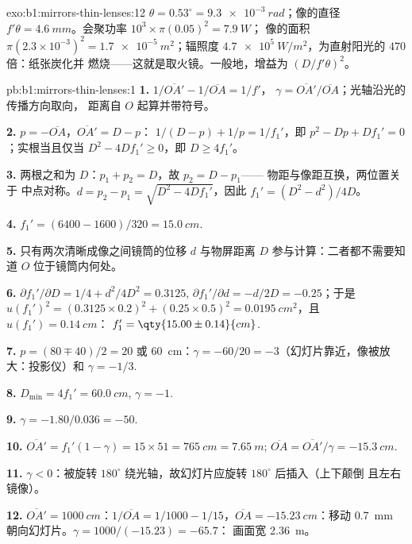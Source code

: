 \begin{solution}{exo:b1:mirrors-thin-lenses:12}
$\theta = 0.53^\circ = \qty{9.3e-3}{rad}$；像的直径 $f'\theta =
\qty{4.6}{mm}$。会聚功率 $10^3 \times \pi(0.05)^2 = \qty{7.9}{W}$；
像的面积 $\pi(2.3\times10^{-3})^2 = \qty{1.7e-5}{m^2}$；辐照度
$\qty{4.7e5}{W/m^2}$，为直射阳光的 $470$ 倍：纸张炭化并
燃烧——这就是取火镜。一般地，增益为
$(D/f'\theta)^2$。
\end{solution}

\begin{solution}{pb:b1:mirrors-thin-lenses:1}
\textbf{1.} $1/\overline{OA'} - 1/\overline{OA} = 1/f'$，
$\gamma = \overline{OA'}/\overline{OA}$；光轴沿光的传播方向取向，
距离自 $O$ 起算并带符号。

\textbf{2.} $p = -\overline{OA}$，$\overline{OA'} = D - p$：
$1/(D - p) + 1/p = 1/f_1'$，即 $p^2 - Dp + Df_1' = 0$；实根当且仅当
$D^2 - 4Df_1' \geq 0$，即 $D \geq 4f_1'$。

\textbf{3.} 两根之和为 $D$：$p_1 + p_2 = D$，故 $p_2 = D - p_1$——
物距与像距互换，两位置关于
中点对称。$d = p_2 - p_1 = \sqrt{D^2 - 4Df_1'}$，因此 $f_1' = (D^2 -
d^2)/4D$。

\textbf{4.} $f_1' = (6400 - 1600)/320 = \qty{15.0}{cm}$.

\textbf{5.} 只有两次清晰成像之间镜筒的位移 $d$
与物屏距离 $D$ 参与计算：二者都不需要知道
$O$ 位于镜筒内何处。

\textbf{6.} $\partial f_1'/\partial D = 1/4 + d^2/4D^2 = 0.3125$,
$\partial f_1'/\partial d = -d/2D = -0.25$；于是
$u(f_1')^2 = (0.3125 \times 0.2)^2 + (0.25 \times 0.5)^2 =
\qty{0.0195}{cm^2}$，且 $u(f_1') = \qty{0.14}{cm}$：
$f_1' = \qty{15.00\pm0.14}{cm}$.

\textbf{7.} $p = (80 \mp 40)/2 = 20$ 或 \qty{60}{cm}：$\gamma =
-60/20 = -3$（幻灯片靠近，像被放大：投影仪）和
$\gamma = -1/3$.

\textbf{8.} $D_{\min} = 4f_1' = \qty{60.0}{cm}$, $\gamma = -1$.

\textbf{9.} $\gamma = -1.80/0.036 = -50$.

\textbf{10.} $\overline{OA'} = f_1'(1 - \gamma) = 15 \times 51 =
\qty{765}{cm} = \qty{7.65}{m}$; $\overline{OA} = \overline{OA'}/\gamma =
\qty{-15.3}{cm}$.

\textbf{11.} $\gamma < 0$：被旋转 $180^\circ$
绕光轴，故幻灯片应旋转 $180^\circ$ 后插入（上下颠倒
且左右镜像）。

\textbf{12.} $\overline{OA'} = \qty{1000}{cm}$：$1/\overline{OA} = 1/1000
- 1/15$，$\overline{OA} = \qty{-15.23}{cm}$：移动 \qty{0.7}{mm}
朝向幻灯片。$\gamma = 1000/(-15.23) = -65.7$：
画面宽 \qty{2.36}{m}。


\end{solution}
